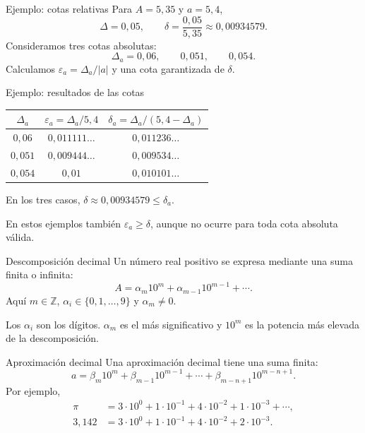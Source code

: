 \documentclass[main.tex]{subfiles}
\begin{document}
\begin{frame}{Ejemplo: cotas relativas}
Para $A=5{,}35$ y $a=5{,}4$,\[\Delta=0{,}05,\qquad\delta=\frac{0{,}05}{5{,}35}\approx0{,}00934579.\]Consideramos tres cotas absolutas:\[\Delta_a=0{,}06,\qquad0{,}051,\qquad0{,}054.\]Calculamos $\varepsilon_a=\Delta_a/|a|$ y una cota garantizada de $\delta$.
\end{frame}

\begin{frame}{Ejemplo: resultados de las cotas}
\small\begin{center}\begin{tabular}{c|c|c}$\Delta_a$&$\varepsilon_a=\Delta_a/5{,}4$&$\delta_a=\Delta_a/(5{,}4-\Delta_a)$\\\hline $0{,}06$&$0{,}011111\ldots$&$0{,}011236\ldots$\\$0{,}051$&$0{,}009444\ldots$&$0{,}009534\ldots$\\$0{,}054$&$0{,}01$&$0{,}010101\ldots$\end{tabular}\end{center}En los tres casos, $\delta\approx0{,}00934579\le\delta_a$.\par\medskip En estos ejemplos también $\varepsilon_a\ge\delta$, aunque no ocurre para toda cota absoluta válida.
\end{frame}

\begin{frame}{Descomposición decimal}
Un número real positivo se expresa mediante una suma finita o infinita:\[A=\alpha_m10^m+\alpha_{m-1}10^{m-1}+\cdots.\]Aquí $m\in\mathbb Z$, $\alpha_i\in\{0,1,\ldots,9\}$ y $\alpha_m\ne0$.\par\medskip Los $\alpha_i$ son los dígitos. $\alpha_m$ es el más significativo y $10^m$ es la potencia más elevada de la descomposición.
\end{frame}

\begin{frame}{Aproximación decimal}
\small Una aproximación decimal tiene una suma finita:\[a=\beta_m10^m+\beta_{m-1}10^{m-1}+\cdots+\beta_{m-n+1}10^{m-n+1}.\]Por ejemplo,\begin{align*}\pi&=3\cdot10^0+1\cdot10^{-1}+4\cdot10^{-2}+1\cdot10^{-3}+\cdots,\\3{,}142&=3\cdot10^0+1\cdot10^{-1}+4\cdot10^{-2}+2\cdot10^{-3}.\end{align*}
\end{frame}
\end{document}
